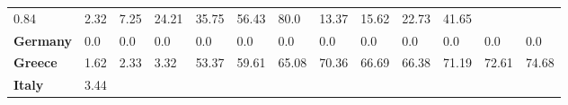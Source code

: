 \begin{table}[H]
{\begin{tabular}{lllllllllllll}
            0.84                                               &
            2.32                                               &
            7.25                                               &
            24.21                                              &
            35.75                                              &
            56.43                                              &
            80.0                                               &
            13.37                                              &
            15.62                                              &
            22.73                                              &
            41.65                                                \\
            \textbf{Germany}                                   &
            0.0                                                &
            0.0                                                &
            0.0                                                &
            0.0                                                &
            0.0                                                &
            0.0                                                &
            0.0                                                &
            0.0                                                &
            0.0                                                &
            0.0                                                &
            0.0                                                &
            0.0                                                  \\
            \textbf{Greece}                                    &
            1.62                                               &
            2.33                                               &
            3.32                                               &
            53.37                                              &
            59.61                                              &
            65.08                                              &
            70.36                                              &
            66.69                                              &
            66.38                                              &
            71.19                                              &
            72.61                                              &
            74.68                                                \\
            \textbf{Italy}                                     &
            3.44                                               &

\end{tabular}}
\end{table}
